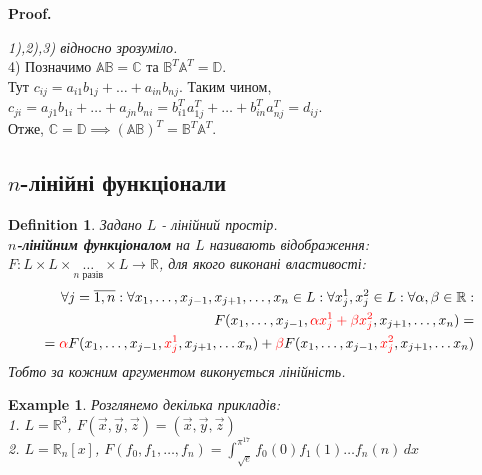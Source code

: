 \documentclass[a4paper, 10pt]{article}
\makeatletter
\theoremstyle{theoremdd}
\newtheorem{definition}[theorem]{Definition}
\newtheorem{example}[theorem]{Example}
\renewenvironment{proof}[1][Proof.\\]{\par
\pushQED{\hfill \qed}%
\normalfont \topsep6\p@\@plus6\p@\relax
\trivlist
\item\relax
{\bfseries
#1\@addpunct{.}}\hspace\labelsep\ignorespaces
}{%
\popQED\endtrivlist\@endpefalse
}
\makeatother
\begin{document}
	\begin{proof}
	\textit{1),2),3) відносно зрозуміло.}\\
	4) Позначимо $\mathbb{A} \mathbb{B} = \mathbb{C}$ та $\mathbb{B}^T \mathbb{A}^T = \mathbb{D}$.\\
	Тут $c_{ij} = a_{i1}b_{1j} + \dots + a_{in}b_{nj}$. Таким чином, $c_{ji} = a_{j1}b_{1i} + \dots + a_{jn}b_{ni} = b_{i1}^T a_{1j}^T + \dots + b_{in}^T a_{nj}^T = d_{ij}$.\\
	Отже, $\mathbb{C} = \mathbb{D} \implies (\mathbb{A} \mathbb{B})^T = \mathbb{B}^T \mathbb{A}^T$.
	\end{proof}

	
	\subsection{$n$-лінійні функціонали}
	\begin{definition}
	Задано $L$ - лінійний простір.\\
	\textbf{$n$-лінійним функціоналом} на $L$ називають відображення: $F: L \times L \times \underset{n\text{ разів}}{\dots} \times L \to \mathbb{R}$, для якого виконані властивості:
	\begin{align*}
	\forall j = \overline{1,n}: \forall x_1,\dots,x_{j-1}, x_{j+1}, \dots, x_n \in L: \forall x_j^1, x_j^2 \in L: \forall \alpha, \beta \in \mathbb{R}:\\
	F(x_1,\dots,x_{j-1}, \textcolor{red}{\alpha x_j^1 + \beta x_j^2}, x_{j+1}, \dots, x_n) = \\ = \textcolor{red}{\alpha} F(x_1, \dots, x_{j-1}, \textcolor{red}{x_j^1}, x_{j+1}, \dots x_n) + \textcolor{red}{\beta} F(x_1, \dots, x_{j-1}, \textcolor{red}{x_j^2}, x_{j+1}, \dots x_n)
	\end{align*}
	Тобто за кожним аргументом виконується лінійність.
	\end{definition}
	
	\begin{example} Розглянемо декілька прикладів: \\
	1. $L = \mathbb{R}^3$, $F(\vec{x},\vec{y},\vec{z}) = (\vec{x}, \vec{y}, \vec{z})$\\
	2. $L = \mathbb{R}_n[x]$, $F(f_0,f_1,\dots,f_n) = \displaystyle \int_{\sqrt{e}}^{\pi^{17}} f_0(0)f_1(1)\dots f_n(n) \,dx$
	\end{example}
	
\end{document}
